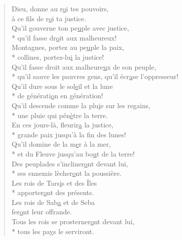 
\begin{verse}
Dieu, donne au r\underline{o}i tes pouvoirs, \\
à ce fils de r\underline{o}i ta justice. \\
Qu’il gouverne ton pe\underline{u}ple avec justice, \\*
qu’il fasse dr\underline{o}it aux malheureux! \\

Montagnes, portez au pe\underline{u}ple la paix, \\*
collines, portez-lu\underline{i} la justice! \\
Qu’il fasse droit aux malheure\underline{u}x de son peuple, \\*
qu’il sauve les pauvres gens, qu’il écr\underline{a}se l’oppresseur! \\

Qu’il dure sous le sol\underline{e}il et la lune \\*
de générati\underline{o}n en génération! \\
Qu’il descende comme la plu\underline{i}e sur les regains, \\*
une pluie qui pén\underline{è}tre la terre. \\

En ces jours-là, fleurir\underline{a} la justice, \\*
grande paix jusqu’à la f\underline{i}n des lunes! \\
Qu’il domine de la m\underline{e}r à la mer, \\*
et du Fleuve jusqu’au bo\underline{u}t de la terre! \\

Des peuplades s’incliner\underline{o}nt devant lui, \\*
ses ennemis lècher\underline{o}nt la poussière. \\
Les rois de Tars\underline{i}s et des Îles \\*
apporter\underline{o}nt des présents. \\

Les rois de Sab\underline{a} et de Seba \\
fer\underline{o}nt leur offrande. \\
Tous les rois se prosterner\underline{o}nt devant lui, \\*
tous les pa\underline{y}s le serviront. \\


\end{verse}
